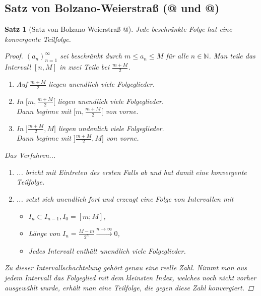\documentclass{article}
\makeatletter
\newtheorem{thm}{Satz}[section]
\newcommand*{\rom}[1]{\expandafter\@slowromancap\romannumeral #1@}
\makeatother
\begin{document}
	\subsection{Satz von Bolzano-Weierstraß (\rom{1} und \rom{2})}
	\begin{thm}[Satz von Bolzano-Weierstraß \rom{1}]
		Jede beschränkte Folge hat eine konvergente Teilfolge.
		
		\begin{proof} \((a_n)_{n=1}^{\infty}\) sei beschränkt durch \(m \leq a_n \leq M\) für alle \(n \in \mathbb{N}\). Man teile das Intervall \([n,M]\) in zwei Teile bei \(\frac{m+M}{2}\).
			\begin{enumerate}[label=\theenumi . Fall:]
				\item Auf \(\frac{m+M}{2}\) liegen unendlich viele Folgeglieder.
				\item In \([m, \frac{m+M}{2}[\) liegen unendlich viele Folgeglieder. \\Dann beginne mit \([m, \frac{m+M}{2}[\) von vorne.
				\item In \(]\frac{m+M}{2}, M]\) liegen undenlich viele Folgeglieder. \\Dann beginne mit \(]\frac{m+M}{2}, M]\) von vorne.
			\end{enumerate}
			\par
			Das Verfahren...
			\begin{enumerate}[label=(\alph*)]
				\item ... bricht mit Eintreten des ersten Falls ab und hat damit eine konvergente Teilfolge.
				\item ... setzt sich unendlich fort und erzeugt eine Folge von Intervallen mit
				\begin{itemize}
					\item \(I_n \subset I_{n-1}, I_0 = [m;M]\),
					\item Länge von \(I_n = \frac{M-m}{2^n} \stackrel{n \to \infty}{\to} 0\),
					\item Jedes Intervall enthält unendlich viele Folgeglieder.
				\end{itemize}
			\end{enumerate}
			\par
			Zu dieser Intervallschachtelung gehört genau eine reelle Zahl. Nimmt man aus jedem Intervall das Folgeglied mit dem kleinsten Index, welches noch nicht vorher ausgewählt wurde, erhält man eine Teilfolge, die gegen diese Zahl konvergiert.
		\end{proof}
	\end{thm}
	
\end{document}
